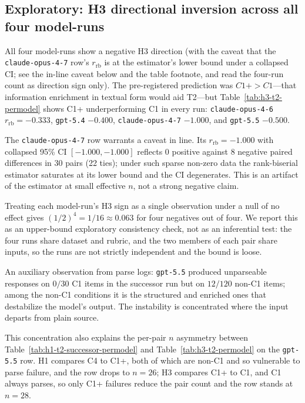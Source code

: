 \documentclass[11pt]{article}
\begin{document}
\subsection{Exploratory: H3 directional inversion across all four model-runs}
\label{sec:4.4}
All four model-runs show a negative H3 direction (with the
caveat that the \texttt{claude-opus-4-7} row's $r_{\text{rb}}$
is at the estimator's lower bound under a collapsed CI; see the
in-line caveat below and the table footnote, and read the
four-run count as direction sign only). The pre-registered
prediction was $C1+ > C1$---that information enrichment in textual
form would aid T2---but Table~\ref{tab:h3-t2-permodel} shows C1+
underperforming C1 in every run: \texttt{claude-opus-4-6}
$r_{\text{rb}} = -0.333$, \texttt{gpt-5.4} $-0.400$,
\texttt{claude-opus-4-7} $-1.000$, and \texttt{gpt-5.5} $-0.500$.

The \texttt{claude-opus-4-7} row warrants a caveat in line. Its
$r_{\text{rb}} = -1.000$ with collapsed 95\% CI $[-1.000, -1.000]$
reflects $0$ positive against $8$ negative paired differences in 30
pairs (22 ties); under such sparse non-zero data the rank-biserial
estimator saturates at its lower bound and the CI degenerates. This
is an artifact of the estimator at small effective $n$, not a strong
negative claim.

Treating each model-run's H3 sign as a single observation under a
null of no effect gives $(1/2)^{4} = 1/16 \approx 0.063$ for four
negatives out of four. We report this as an upper-bound exploratory
consistency check, not as an inferential test: the four runs share
dataset and rubric, and the two members of each pair share inputs,
so the runs are not strictly independent and the bound is loose.

An auxiliary observation from parse logs: \texttt{gpt-5.5} produced
unparseable responses on $0/30$ C1 items in the successor run but on
$12/120$ non-C1 items; among the non-C1 conditions it is the
structured and enriched ones that destabilize the model's output.
The instability is concentrated where the input departs from plain
source.

This concentration also explains the per-pair $n$ asymmetry
between Table~\ref{tab:h1-t2-successor-permodel} and
Table~\ref{tab:h3-t2-permodel} on the \texttt{gpt-5.5} row. H1
compares C4 to C1+, both of which are non-C1 and so vulnerable
to parse failure, and the row drops to $n = 26$; H3 compares
C1+ to C1, and C1 always parses, so only C1+ failures reduce
the pair count and the row stands at $n = 28$.
\end{document}

